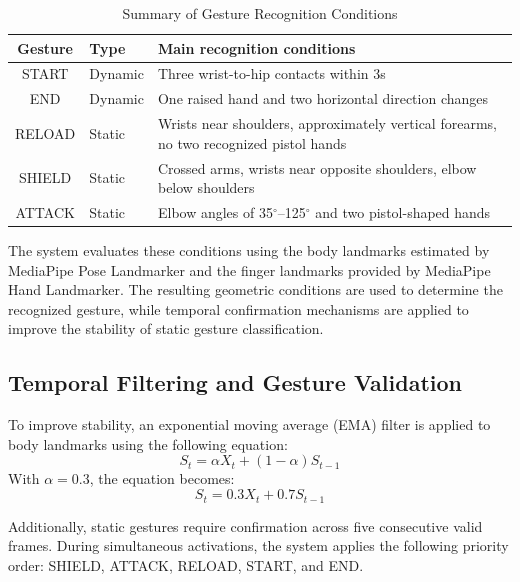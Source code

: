 \documentclass[lettersize,journal]{IEEEtran}
\begin{document}
	\begin{table}[!t]
		\centering
		\caption{Summary of Gesture Recognition Conditions}
		\label{tab:gesture_conditions}
		\vspace{0.5em}
		\begin{tabularx}{\columnwidth}{@{}c l X@{}}
			\toprule
			\textbf{Gesture} & \textbf{Type} & \textbf{Main recognition conditions} \\
			\midrule
			START & Dynamic & Three wrist-to-hip contacts within 3s \\
			END & Dynamic & One raised hand and two horizontal direction changes \\
			RELOAD & Static & Wrists near shoulders, approximately vertical forearms, no two recognized pistol hands \\
			SHIELD & Static & Crossed arms, wrists near opposite shoulders, elbow below shoulders \\
			ATTACK & Static & Elbow angles of 35$^\circ$--125$^\circ$ and two pistol-shaped hands \\
			\bottomrule
		\end{tabularx}
	\end{table}
	
	The system evaluates these conditions using the body landmarks estimated by MediaPipe Pose Landmarker and the finger landmarks provided by MediaPipe Hand Landmarker. The resulting geometric conditions are used to determine the recognized gesture, while temporal confirmation mechanisms are applied to improve the stability of static gesture classification.
	
	\subsection{Temporal Filtering and Gesture Validation}
	
	To improve stability, an exponential moving average (EMA) filter is applied to body landmarks using the following equation:
	\begin{equation}
		S_t = \alpha X_t + (1 - \alpha)S_{t-1}
	\end{equation} 
	With $\alpha = 0.3$, the equation becomes:
	\begin{equation}
		S_t = 0.3X_t + 0.7S_{t-1}
	\end{equation} 
	
	Additionally, static gestures require confirmation across five consecutive valid frames. During simultaneous activations, the system applies the following priority order: SHIELD, ATTACK, RELOAD, START, and END.
\end{document}
